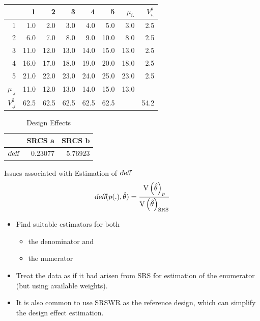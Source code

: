\documentclass[10pt]{beamer}\usepackage[]{graphicx}\usepackage[]{color}
\newcommand{\V}[1]{\text{V}\left(#1\right)}
\newcommand{\deff}{\ensuremath{\text{\slshape deff}}}
\begin{document}
\begin{frame}
{\begin{table}[ht]
\begin{tabular}{r|rrrrr|r|r}
  & 1 & 2 & 3 & 4 & 5 & $\mu_{i.}$ & $V^2_{i.}$ \\ 
  \hline
1 & 1.0 & 2.0 & 3.0 & 4.0 & 5.0 & 3.0 & 2.5 \\ 
  2 & 6.0 & 7.0 & 8.0 & 9.0 & 10.0 & 8.0 & 2.5 \\ 
  3 & 11.0 & 12.0 & 13.0 & 14.0 & 15.0 & 13.0 & 2.5 \\ 
  4 & 16.0 & 17.0 & 18.0 & 19.0 & 20.0 & 18.0 & 2.5 \\ 
  5 & 21.0 & 22.0 & 23.0 & 24.0 & 25.0 & 23.0 & 2.5 \\ 
   \hline
$\mu_{.j}$ & 11.0 & 12.0 & 13.0 & 14.0 & 15.0 & 13.0 &  \\ 
   \hline
$V^2_{.j}$ & 62.5 & 62.5 & 62.5 & 62.5 & 62.5 &  & 54.2 \\ 
  \end{tabular}
\end{table}
\begin{table}[ht]
\centering
\caption{Design Effects} 
\begin{tabular}{l|rr}
  & SRCS a & SRCS b \\ 
  \hline
$\deff$ & 0.23077 & 5.76923 \\ 
  \end{tabular}
\end{table}

}

\end{frame}


\begin{frame}{Issues associated with Estimation of $\deff$}
  $$ \deff(p(.),\hat{\theta}) = \dfrac{\V{\hat{\theta}}_p}{\V{\hat{\theta}}_{\text{SRS}}} $$
	\begin{itemize}
		\item<1->{ Find suitable estimators for both
		\begin{itemize}
			\item the denominator and
			\item the numerator
		\end{itemize}
		}
		\item<2-> Treat the data as if it had arisen from SRS for estimation of the enumerator (but using available weights).
	\item<3> It is also common to use SRSWR as the reference design, which can simplify the design effect estimation.
	\end{itemize}
	
\end{frame}
\end{document}
